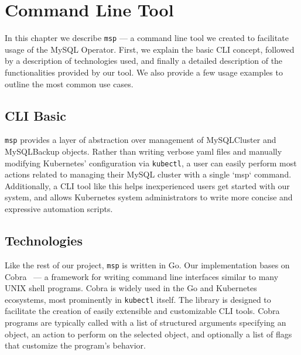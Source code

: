 \chapter{Command Line Tool}
In this chapter we describe \texttt{msp} --- a command line tool we created 
to facilitate usage of the MySQL Operator. First, we explain the basic CLI 
concept, followed by a description of technologies used, and finally a 
detailed description of the functionalities provided by our tool. We also 
provide a few usage examples to outline the most common use cases.

\section{CLI Basic}
\texttt{msp} provides a layer of abstraction over management of MySQLCluster 
and MySQLBackup objects. Rather than writing verbose yaml files and manually 
modifying Kubernetes’ configuration via \texttt{kubectl}, a user can easily 
perform most actions related to managing their MySQL cluster with a single 
`msp` command. Additionally, a CLI tool like this helps inexperienced users 
get started with our system, and allows Kubernetes system administrators to 
write more concise and expressive automation scripts.

\section{Technologies}
Like the rest of our project, \texttt{msp} is written in Go. Our implementation 
bases on Cobra~\cite{cobra} --- a framework for writing command line interfaces 
similar to many UNIX shell programs. Cobra is widely used in the Go and 
Kubernetes ecosystems, most prominently in \texttt{kubectl} itself. The 
library is designed to facilitate the creation of easily extensible and 
customizable CLI tools. Cobra programs are typically called with a list 
of structured arguments specifying an object, an action to perform on the 
selected object, and optionally a list of flags that customize the program’s 
behavior. 

